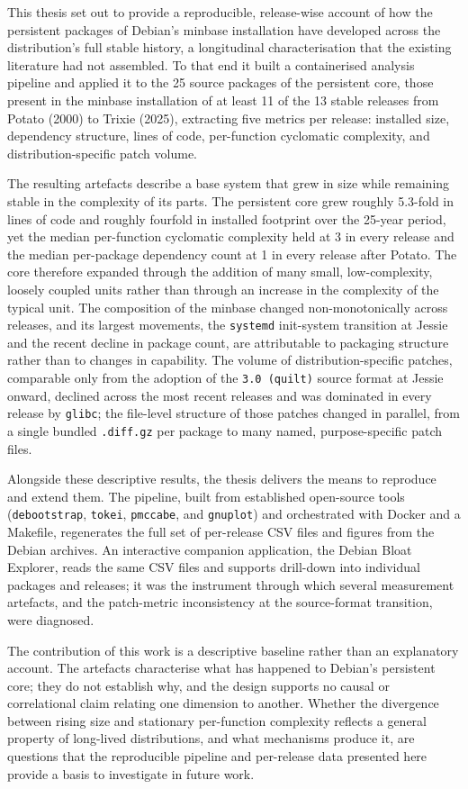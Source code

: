 This thesis set out to provide a reproducible, release-wise account of how the persistent packages of Debian's minbase installation have developed across the distribution's full stable history, a longitudinal characterisation that the existing literature had not assembled. To that end it built a containerised analysis pipeline and applied it to the 25 source packages of the persistent core, those present in the minbase installation of at least 11 of the 13 stable releases from Potato (2000) to Trixie (2025), extracting five metrics per release: installed size, dependency structure, lines of code, per-function cyclomatic complexity, and distribution-specific patch volume.

The resulting artefacts describe a base system that grew in size while remaining stable in the complexity of its parts. The persistent core grew roughly 5.3-fold in lines of code and roughly fourfold in installed footprint over the 25-year period, yet the median per-function cyclomatic complexity held at 3 in every release and the median per-package dependency count at 1 in every release after Potato. The core therefore expanded through the addition of many small, low-complexity, loosely coupled units rather than through an increase in the complexity of the typical unit. The composition of the minbase changed non-monotonically across releases, and its largest movements, the \texttt{systemd} init-system transition at Jessie and the recent decline in package count, are attributable to packaging structure rather than to changes in capability. The volume of distribution-specific patches, comparable only from the adoption of the \texttt{3.0 (quilt)} source format at Jessie onward, declined across the most recent releases and was dominated in every release by \texttt{glibc}; the file-level structure of those patches changed in parallel, from a single bundled \texttt{.diff.gz} per package to many named, purpose-specific patch files.

Alongside these descriptive results, the thesis delivers the means to reproduce and extend them. The pipeline, built from established open-source tools (\texttt{debootstrap}, \texttt{tokei}, \texttt{pmccabe}, and \texttt{gnuplot}) and orchestrated with Docker and a Makefile, regenerates the full set of per-release CSV files and figures from the Debian archives. An interactive companion application, the Debian Bloat Explorer, reads the same CSV files and supports drill-down into individual packages and releases; it was the instrument through which several measurement artefacts, and the patch-metric inconsistency at the source-format transition, were diagnosed.

The contribution of this work is a descriptive baseline rather than an explanatory account. The artefacts characterise what has happened to Debian's persistent core; they do not establish why, and the design supports no causal or correlational claim relating one dimension to another. Whether the divergence between rising size and stationary per-function complexity reflects a general property of long-lived distributions, and what mechanisms produce it, are questions that the reproducible pipeline and per-release data presented here provide a basis to investigate in future work.
